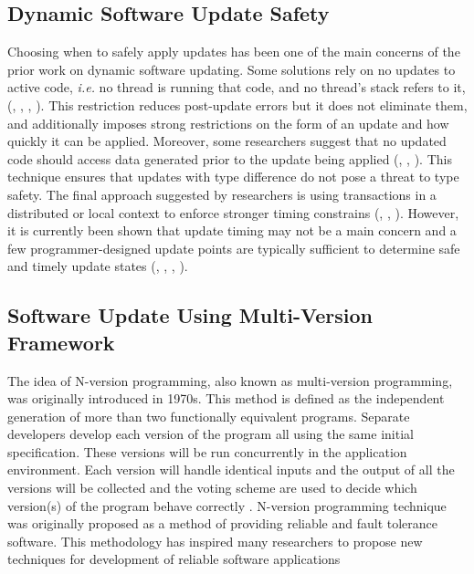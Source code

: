 \documentclass[a4paper,11pt,twoside]{article}
\begin{document}
\subsection{Dynamic Software Update Safety}
Choosing when to safely apply updates has been one of the main concerns of the prior work on dynamic software updating. Some solutions rely on no updates to active code, \textit{i.e.} no thread is running that code, and no thread's stack refers to it, (\cite{Safety 32}, \cite{Ksplice}, \cite{K42}, \cite{Safety 43} ). This restriction reduces post-update errors but it does not eliminate them, and additionally imposes strong restrictions on the form of an update and how quickly it can be applied. Moreover, some researchers suggest that no updated code should access data generated prior to the update being applied (\cite{Safety 213}, \cite{Safety 214}, \cite{Safety 267}). This technique ensures that updates with type difference do not pose a threat to type safety. The final approach suggested by researchers is using transactions in a distributed or local context to enforce stronger timing constrains (\cite{Safety 173}, \cite{Safety 215}, \cite{Safety 279}). However, it is currently been shown that update timing may not be a main concern and a few programmer-designed update points are typically sufficient to determine safe and timely update states (\cite{Safety 213}, \cite{Kitsune}, \cite{Safety 131}, \cite{Safety 108}). 

\subsection{Software Update Using Multi-Version Framework} \label{upgrade1} 
The idea of N-version programming, also known as multi-version programming, was originally introduced in 1970s. This method is defined as the independent generation of more than two functionally equivalent programs. Separate developers develop each version of the program all using the same initial specification. These versions will be run concurrently in the application environment. Each version will handle identical inputs and the output of all the versions will be collected and the voting scheme are used to decide which version(s) of the program behave correctly \cite{N-version programming}. N-version programming technique was originally proposed as a method of providing reliable and fault tolerance software. This methodology has inspired many researchers to propose new techniques for development of reliable software applications 
\end{document}
